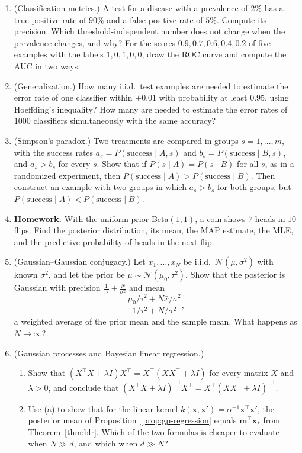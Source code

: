 \documentclass[11pt]{article}
\newcommand{\homework}{\textcolor{red!70!black}{\textbf{Homework.}}}
\theoremstyle{definition}
\theoremstyle{plain}
\theoremstyle{remark}
\begin{document}
\begin{enumerate}[leftmargin=*]
    \item (Classification metrics.) A test for a disease with a prevalence of $2\%$ has a true positive rate of $90\%$ and a false positive rate of $5\%$. Compute its precision. Which threshold-independent number does not change when the prevalence changes, and why? For the scores $0.9, 0.7, 0.6, 0.4, 0.2$ of five examples with the labels $1, 0, 1, 0, 0$, draw the ROC curve and compute the AUC in two ways.
    \item (Generalization.) How many i.i.d.\ test examples are needed to estimate the error rate of one classifier within $\pm 0.01$ with probability at least $0.95$, using Hoeffding's inequality? How many are needed to estimate the error rates of $1000$ classifiers simultaneously with the same accuracy?
    \item (Simpson's paradox.) Two treatments are compared in groups $s = 1, \ldots, m$, with the success rates $a_s = P(\text{success} \mid A, s)$ and $b_s = P(\text{success} \mid B, s)$, and $a_s > b_s$ for every $s$. Show that if $P(s \mid A) = P(s \mid B)$ for all $s$, as in a randomized experiment, then $P(\text{success} \mid A) > P(\text{success} \mid B)$. Then construct an example with two groups in which $a_s > b_s$ for both groups, but $P(\text{success} \mid A) < P(\text{success} \mid B)$.
    \item \homework{} With the uniform prior Beta$(1, 1)$, a coin shows $7$ heads in $10$ flips. Find the posterior distribution, its mean, the MAP estimate, the MLE, and the predictive probability of heads in the next flip.
    \item (Gaussian--Gaussian conjugacy.) Let $x_1, \ldots, x_N$ be i.i.d.\ $\mathcal{N}(\mu, \sigma^2)$ with known $\sigma^2$, and let the prior be $\mu \sim \mathcal{N}(\mu_0, \tau^2)$. Show that the posterior is Gaussian with precision $\frac{1}{\tau^2} + \frac{N}{\sigma^2}$ and mean
    \[\frac{\mu_0/\tau^2 + N\bar x/\sigma^2}{1/\tau^2 + N/\sigma^2},\]
    a weighted average of the prior mean and the sample mean. What happens as $N \to \infty$?
    \item (Gaussian processes and Bayesian linear regression.)
    \begin{enumerate}[label=(\alph*)]
        \item Show that $(X^\top X + \lambda I)X^\top = X^\top(XX^\top + \lambda I)$ for every matrix $X$ and $\lambda > 0$, and conclude that $(X^\top X + \lambda I)^{-1}X^\top = X^\top(XX^\top + \lambda I)^{-1}$.
        \item Use (a) to show that for the linear kernel $k(\mathbf{x}, \mathbf{x}') = \alpha^{-1}\mathbf{x}^\top\mathbf{x}'$, the posterior mean of Proposition~\ref{prop:gp-regression} equals $\mathbf{m}^\top\mathbf{x}_*$ from Theorem~\ref{thm:blr}. Which of the two formulas is cheaper to evaluate when $N \gg d$, and which when $d \gg N$?

\end{enumerate}
\end{enumerate}
\end{document}

